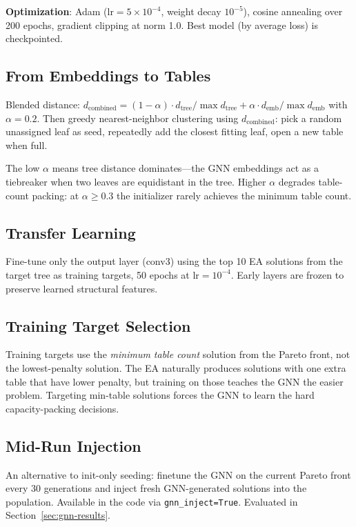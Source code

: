 \documentclass[11pt,a4paper]{article}
\begin{document}
\textbf{Optimization}: Adam ($\text{lr}=5 \times 10^{-4}$, weight decay $10^{-5}$), cosine annealing over 200 epochs, gradient clipping at norm 1.0.  Best model (by average loss) is checkpointed.

\subsection{From Embeddings to Tables}

Blended distance: $d_{\text{combined}} = (1-\alpha) \cdot d_{\text{tree}}/\max d_{\text{tree}} + \alpha \cdot d_{\text{emb}}/\max d_{\text{emb}}$ with $\alpha=0.2$.  Then greedy nearest-neighbor clustering using $d_{\text{combined}}$: pick a random unassigned leaf as seed, repeatedly add the closest fitting leaf, open a new table when full.

The low $\alpha$ means tree distance dominates---the GNN embeddings act as a tiebreaker when two leaves are equidistant in the tree.  Higher $\alpha$ degrades table-count packing: at $\alpha \geq 0.3$ the initializer rarely achieves the minimum table count.

\subsection{Transfer Learning}

Fine-tune only the output layer (conv3) using the top 10 EA solutions from the target tree as training targets, 50 epochs at $\text{lr}=10^{-4}$.  Early layers are frozen to preserve learned structural features.

\subsection{Training Target Selection}

Training targets use the \emph{minimum table count} solution from the Pareto front, not the lowest-penalty solution.  The EA naturally produces solutions with one extra table that have lower penalty, but training on those teaches the GNN the easier problem.  Targeting min-table solutions forces the GNN to learn the hard capacity-packing decisions.

\subsection{Mid-Run Injection}

An alternative to init-only seeding: finetune the GNN on the current Pareto front every 30 generations and inject fresh GNN-generated solutions into the population.  Available in the code via \texttt{gnn\_inject=True}.  Evaluated in Section~\ref{sec:gnn-results}.
\end{document}
